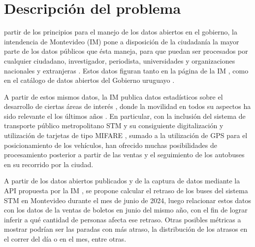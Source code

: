 \documentclass[journal]{IEEEtran}
\begin{document}
\section{Descripción del problema}
% 
% 
% 
% 
 partir de los principios para el manejo de los datos abiertos en el gobierno, \cite{principios} \cite{datos-abiertos} la intendencia de Montevideo (IM) pone a disposición de la ciudadanía la mayor parte de los datos públicos que ésta maneja, para que puedan ser procesados por cualquier ciudadano, investigador, periodista, universidades y organizaciones nacionales y extranjeras \cite{areas-tematicas}. Estos datos figuran tanto en la página de la IM \cite{ckan}, como en el catálogo de datos abiertos del Gobierno uruguayo \cite{catalogo-datos}.

A partir de estos mismos datos, la IM publica datos estadísticos sobre el desarrollo de ciertas áreas de interés \cite{montevidata}, donde la movilidad en todos su aspectos ha sido relevante el los últimos años \cite{movilidad}. En particular, con la inclusión del sistema de transporte público metropolitano STM y su consiguiente digitalización y utilización de tarjetas de tipo MIFARE \cite{mifare}, sumado a la utilización de GPS para el posicionamiento de los vehículos, han ofrecido muchas posibilidades de  procesamiento  posterior a partir de las ventas y el seguimiento de los autobuses en su recorrido por la ciudad.

A partir de los datos abiertos publicados y de la captura de datos mediante la API propuesta por la IM \cite{api-im}, se propone calcular el retraso de los buses del sistema STM en Montevideo durante el mes de junio de 2024, luego relacionar estos datos con los datos de la ventas de boletos en junio del mismo año, con el fin de lograr inferir a qué cantidad de personas afecta ese retraso. Otras posibles métricas a mostrar podrían ser las paradas con más atraso, la distribución de los atrasos en el correr del día o en el mes, entre otras.
\end{document}
